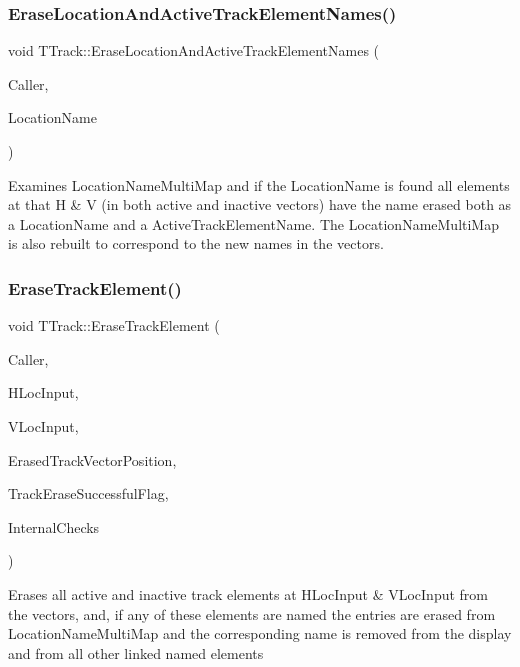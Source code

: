 \subsubsection{\texorpdfstring{Erase\+Location\+And\+Active\+Track\+Element\+Names()}{EraseLocationAndActiveTrackElementNames()}}
{\footnotesize\ttfamily void T\+Track\+::\+Erase\+Location\+And\+Active\+Track\+Element\+Names (\begin{DoxyParamCaption}\item[{int}]{Caller,  }\item[{Ansi\+String}]{Location\+Name }\end{DoxyParamCaption})}

Examines Location\+Name\+Multi\+Map and if the Location\+Name is found all elements at that H \& V (in both active and inactive vectors) have the name erased both as a Location\+Name and a Active\+Track\+Element\+Name. The Location\+Name\+Multi\+Map is also rebuilt to correspond to the new names in the vectors. \mbox{\label{class_t_track_aa7b58c83ca1743ad3e4607ac0af9c71c}} 
\subsubsection{\texorpdfstring{Erase\+Track\+Element()}{EraseTrackElement()}}
{\footnotesize\ttfamily void T\+Track\+::\+Erase\+Track\+Element (\begin{DoxyParamCaption}\item[{int}]{Caller,  }\item[{int}]{H\+Loc\+Input,  }\item[{int}]{V\+Loc\+Input,  }\item[{int \&}]{Erased\+Track\+Vector\+Position,  }\item[{bool \&}]{Track\+Erase\+Successful\+Flag,  }\item[{bool}]{Internal\+Checks }\end{DoxyParamCaption})}

Erases all active and inactive track elements at H\+Loc\+Input \& V\+Loc\+Input from the vectors, and, if any of these elements are named the entries are erased from Location\+Name\+Multi\+Map and the corresponding name is removed from the display and from all other linked named elements \mbox{\label{class_t_track_a0510eacbf80200ff27d991606acf9924}} 
